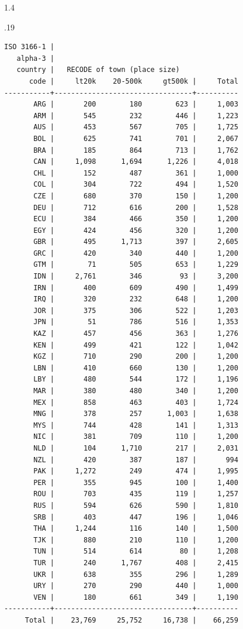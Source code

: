 \documentclass[10pt, letterpaper]{article}
\begin{document}
\begin{spacing}{1.4}
\begin{scriptsize}
\begin{spacing}{.19}
\begin{verbatim}
ISO 3166-1 |
   alpha-3 |
   country |   RECODE of town (place size)
      code |     lt20k    20-500k     gt500k |     Total
-----------+---------------------------------+----------
       ARG |       200        180        623 |     1,003 
       ARM |       545        232        446 |     1,223 
       AUS |       453        567        705 |     1,725 
       BOL |       625        741        701 |     2,067 
       BRA |       185        864        713 |     1,762 
       CAN |     1,098      1,694      1,226 |     4,018 
       CHL |       152        487        361 |     1,000 
       COL |       304        722        494 |     1,520 
       CZE |       680        370        150 |     1,200 
       DEU |       712        616        200 |     1,528 
       ECU |       384        466        350 |     1,200 
       EGY |       424        456        320 |     1,200 
       GBR |       495      1,713        397 |     2,605 
       GRC |       420        340        440 |     1,200 
       GTM |        71        505        653 |     1,229 
       IDN |     2,761        346         93 |     3,200 
       IRN |       400        609        490 |     1,499 
       IRQ |       320        232        648 |     1,200 
       JOR |       375        306        522 |     1,203 
       JPN |        51        786        516 |     1,353 
       KAZ |       457        456        363 |     1,276 
       KEN |       499        421        122 |     1,042 
       KGZ |       710        290        200 |     1,200 
       LBN |       410        660        130 |     1,200 
       LBY |       480        544        172 |     1,196 
       MAR |       380        480        340 |     1,200 
       MEX |       858        463        403 |     1,724 
       MNG |       378        257      1,003 |     1,638 
       MYS |       744        428        141 |     1,313 
       NIC |       381        709        110 |     1,200 
       NLD |       104      1,710        217 |     2,031 
       NZL |       420        387        187 |       994 
       PAK |     1,272        249        474 |     1,995 
       PER |       355        945        100 |     1,400 
       ROU |       703        435        119 |     1,257 
       RUS |       594        626        590 |     1,810 
       SRB |       403        447        196 |     1,046 
       THA |     1,244        116        140 |     1,500 
       TJK |       880        210        110 |     1,200 
       TUN |       514        614         80 |     1,208 
       TUR |       240      1,767        408 |     2,415 
       UKR |       638        355        296 |     1,289 
       URY |       270        290        440 |     1,000 
       VEN |       180        661        349 |     1,190 
-----------+---------------------------------+----------
     Total |    23,769     25,752     16,738 |    66,259 




\end{verbatim}
\end{spacing}
\end{scriptsize}
\end{spacing}
\end{document}
